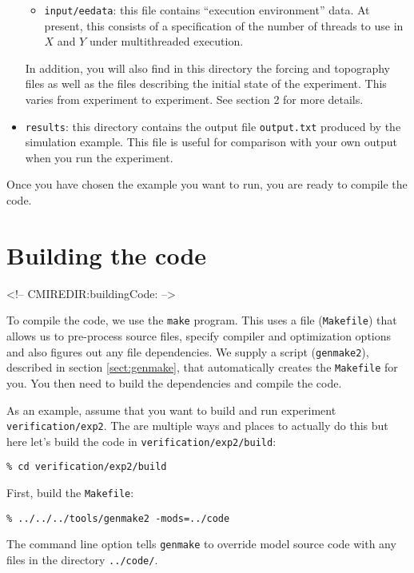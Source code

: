 \begin{itemize}
\begin{itemize}
  \item \texttt{input/eedata}: this file contains ``execution
    environment'' data. At present, this consists of a specification
    of the number of threads to use in $X$ and $Y$ under multithreaded
    execution.
  \end{itemize}
  
  In addition, you will also find in this directory the forcing and
  topography files as well as the files describing the initial state
  of the experiment.  This varies from experiment to experiment. See
  section 2 for more details.

\item \texttt{results}: this directory contains the output file
  \texttt{output.txt} produced by the simulation example. This file is
  useful for comparison with your own output when you run the
  experiment.
\end{itemize}

Once you have chosen the example you want to run, you are ready to
compile the code.

\section[Building MITgcm]{Building the code}
\label{sect:buildingCode}
\begin{rawhtml}
<!-- CMIREDIR:buildingCode: -->
\end{rawhtml}

To compile the code, we use the \texttt{make} program. This uses a
file (\texttt{Makefile}) that allows us to pre-process source files,
specify compiler and optimization options and also figures out any
file dependencies. We supply a script (\texttt{genmake2}), described
in section \ref{sect:genmake}, that automatically creates the
\texttt{Makefile} for you. You then need to build the dependencies and
compile the code.

As an example, assume that you want to build and run experiment
\texttt{verification/exp2}. The are multiple ways and places to
actually do this but here let's build the code in
\texttt{verification/exp2/build}:
\begin{verbatim}
% cd verification/exp2/build
\end{verbatim}
First, build the \texttt{Makefile}:
\begin{verbatim}
% ../../../tools/genmake2 -mods=../code
\end{verbatim}
The command line option tells \texttt{genmake} to override model source
code with any files in the directory \texttt{../code/}.

